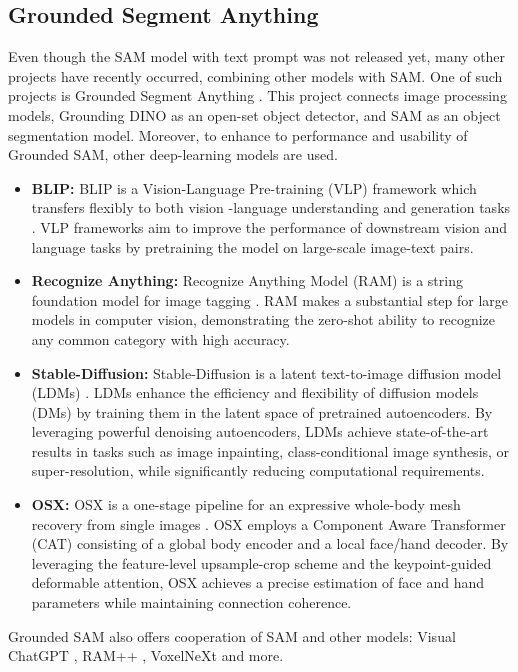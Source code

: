\subsection{Grounded Segment Anything}
Even though the SAM model with text prompt was not released yet, many other projects have recently occurred, combining
other models with SAM. One of such projects is Grounded Segment Anything \cite{ren2024grounded}. This project connects
image processing models, Grounding DINO \cite{liu2023grounding} as an open-set object detector, and SAM \cite{SAM2023} as
an object segmentation model. Moreover, to enhance to performance and usability of Grounded SAM, other deep-learning
models are used.
\begin{itemize}
  \item \textbf{BLIP:} BLIP is a Vision-Language Pre-training (VLP) framework which transfers flexibly to both vision
  -language understanding and generation tasks \cite{li2022blip}. VLP frameworks aim to improve the performance of
  downstream vision and language tasks by pretraining the model on large-scale image-text pairs.
  \item \textbf{Recognize Anything:} Recognize Anything Model (RAM) is a string foundation model for image tagging \cite{zhang2023recognize}. RAM makes
  a substantial step for large models in computer vision,
  demonstrating the zero-shot ability to recognize any common category with high accuracy.
  \item \textbf{Stable-Diffusion:} Stable-Diffusion is a latent text-to-image diffusion model (LDMs) \cite{rombach2022highresolution}. LDMs enhance the efficiency and flexibility of diffusion models (DMs) by training
  them in the latent space of pretrained autoencoders. By leveraging powerful denoising autoencoders, LDMs achieve
  state-of-the-art results in tasks such as image inpainting, class-conditional image synthesis, or super-resolution, while significantly reducing computational requirements.
  \item \textbf{OSX:} OSX is a one-stage pipeline for an expressive whole-body mesh recovery from single images \cite{
    OSX2023}. OSX employs a Component Aware Transformer (CAT) consisting of a global body encoder and a local face/hand decoder. By leveraging the feature-level upsample-crop scheme and the keypoint-guided deformable attention, OSX
  achieves a precise estimation of face and hand parameters while maintaining connection coherence.
\end{itemize}
Grounded SAM also offers cooperation of SAM and other models: Visual ChatGPT \cite{wu2023visual}, RAM++ \cite{huang2023openset}, VoxelNeXt \cite{chen2023voxelnext} and more.

